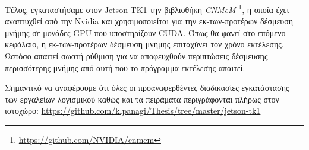 Τέλος, εγκαταστήσαμε στον Jetson TK1 την βιβλιοθήκη \emph{CNMeM}
\footnote{\href{https://github.com/NVIDIA/cnmem}{https://github.com/NVIDIA/cnmem}},
η οποία έχει αναπτυχθεί από την Nvidia και χρησιμοποιείται για την εκ-των-προτέρων
δέσμευση μνήμης σε μονάδες GPU που υποστηρίζουν CUDA.
Όπως θα φανεί στο επόμενο κεφάλαιο, η εκ-των-προτέρων δέσμευση μνήμης
επιταχύνει τον χρόνο εκτέλεσης. Ωστόσο απαιτεί σωστή ρύθμιση για να
αποφευχθούν περιπτώσεις δέσμευσης περισσότερης μνήμης από αυτή που το
πρόγραμμα εκτέλεσης απαιτεί.

Σημαντικό να αναφέρουμε ότι όλες οι προαναφερθέντες διαδικασίες εγκατάστασης των
εργαλείων λογισμικού καθώς και τα πειράματα περιγράφονται πλήρως στον
ιστοχώρο: \href{https://github.com/klpanagi/Thesis/tree/master/jetson-tk1}{https://github.com/klpanagi/Thesis/tree/master/jetson-tk1}

\label{sec:implementations_jetson}

